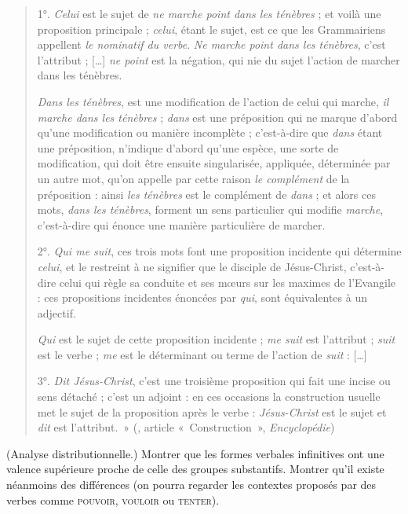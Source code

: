 {\begin{quote}
    1°. \textit{Celui} est le sujet de \textit{ne marche point dans les ténèbres} ; et voilà une proposition principale ; \textit{celui}, étant le sujet, est ce que les Grammairiens appellent \textit{le nominatif du verbe}. \textit{Ne marche point dans les ténèbres}, c’est l’attribut ; […] \textit{ne point} est la négation, qui nie du sujet l’action de marcher dans les ténèbres.

    \textit{Dans les ténèbres}, est une modification de l’action de celui qui marche, \textit{il marche dans les ténèbres} ; \textit{dans} est une préposition qui ne marque d’abord qu’une modification ou manière incomplète ; c’est-à-dire que \textit{dans} étant une préposition, n’indique d’abord qu’une espèce, une sorte de modification, qui doit être ensuite singularisée, appliquée, déterminée par un autre mot, qu’on appelle par cette raison \textit{le complément} de la préposition : ainsi \textit{les ténèbres} est le complément de \textit{dans} ; et alors ces mots, \textit{dans les ténèbres}, forment un sens particulier qui modifie \textit{marche}, c’est-à-dire qui énonce une manière particulière de marcher.

    2°. \textit{Qui me suit}, ces trois mots font une proposition incidente qui détermine \textit{celui}, et le restreint à ne signifier que le disciple de Jésus-Christ, c’est-à-dire celui qui règle sa conduite et ses mœurs sur les maximes de l’Evangile : ces propositions incidentes énoncées par \textit{qui}, sont équivalentes à un adjectif.

    \textit{Qui} est le sujet de cette proposition incidente ; \textit{me suit} est l’attribut ; \textit{suit} est le verbe ; \textit{me} est le dé​​terminant ou terme de l’action de \textit{suit} : […]

    3°. \textit{Dit Jésus-Christ}, c’est une troisième proposition qui fait une incise ou sens détaché ; c’est un adjoint : en ces occasions la construction usuelle met le sujet de la proposition après le verbe : \textit{Jésus-Christ} est le sujet et \textit{dit} est l’attribut.~» (\cite{Dumarsais1754}, article «~Construction~», \textit{Encyclopédie})
    \end{quote}

     ({Analyse distributionnelle.}) Montrer que les formes verbales infinitives ont une valence supérieure proche de celle des groupes substantifs. Montrer qu’il existe néanmoins des différences (on pourra regarder les contextes proposés par des verbes comme \textsc{pouvoir}, \textsc{vouloir}  ou \textsc{tenter).}

}
